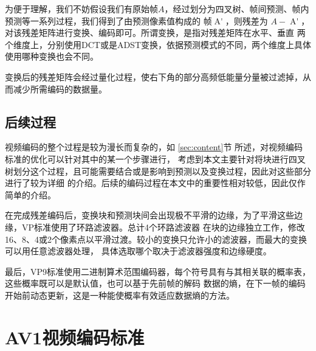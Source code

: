 

为便于理解，我们不妨假设我们有原始帧$A$，经过划分为四叉树、帧间预测、帧内预测等一系列过程，我们得到了由预测像素值构成的
帧$\mathop{{A}'}$，则残差为 $A - \mathop{{A}'}$，对该残差矩阵进行变换、编码即可。所谓变换，是指对残差矩阵在水平、垂直
两个维度上，分别使用DCT或是ADST变换，依据预测模式的不同，两个维度上具体使用哪种变换也会不同。


变换后的残差矩阵会经过量化过程，使右下角的部分高频低能量分量被过滤掉，从而减少所需编码的数据量。

\subsection{后续过程}

视频编码的整个过程是较为漫长而复杂的，如 \ref{sec:content}节 所述，对视频编码标准的优化可以针对其中的某一个步骤进行，
考虑到本文主要针对将块进行四叉树划分这个过程，且可能需要结合或是影响到预测以及变换过程，因此对这些部分进行了较为详细
的介绍。后续的编码过程在本文中的重要性相对较低，因此仅作简单的介绍。

在完成残差编码后，变换块和预测块间会出现极不平滑的边缘，为了平滑这些边缘，VP标准使用了环路滤波器。总计4个环路滤波器
在块的边缘独立工作，修改16、8、4或2个像素点以平滑过渡。较小的变换只允许小的滤波器，而最大的变换可以用任意滤波器处理，
具体选取哪个取决于滤波器强度和边缘硬度。

最后，VP9标准使用二进制算术范围编码器，每个符号具有与其相关联的概率表，这些概率既可以是默认值，也可以基于先前帧的解码
数据的熵，在下一帧的编码开始前动态更新，这是一种能使概率有效适应数据熵的方法。

\section{AV1视频编码标准}

